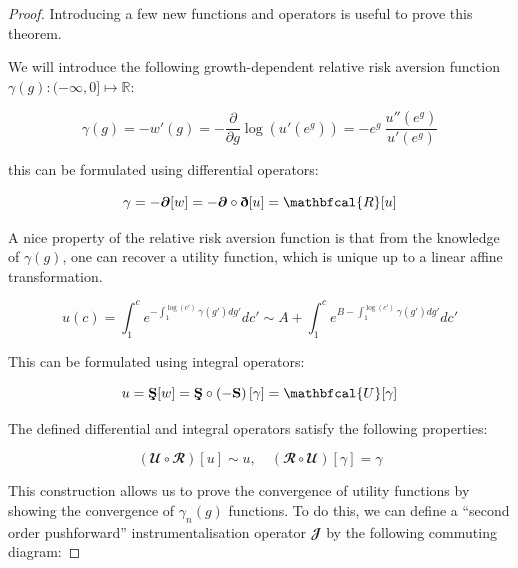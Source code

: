 \documentclass{article}
\theoremstyle{definition}
\begin{document}
\begin{proof}
    Introducing a few new functions and operators is useful to prove this theorem.

    We will introduce the following growth-dependent relative risk aversion function $\gamma(g): (-\infty, 0] \mapsto \mathbb{R}$: 

    \begin{equation}
        \gamma(g) = - w'(g) = - \frac{\partial}{\partial g} \log(u'(e^g)) =  - e^g \ \frac{ u''(e^g)}{u'(e^g)}
    \end{equation}

    this can be formulated using differential operators:

    \begin{equation}
        \gamma = - \bm{\partial} [w] = - \bm{\partial} \circ \text{\bf \dh} [u] = \mathbfcal{R} [u]
    \end{equation}

    A nice property of the relative risk aversion function is that from the knowledge of $\gamma(g)$, one can recover a utility function, which is unique up to a linear affine transformation.

    \begin{equation}
        u(c) = \int_{1}^{c} e^{-\int_{1}^{\log(c')} \gamma(g') d g'} d c' 
        \sim  A + \int_{1}^{c} e^{B - \int_{1}^{\log(c')} \gamma(g') d g'} d c' 
    \end{equation}

    This can be formulated using integral operators:

    \begin{equation}
        u = \text{\bf \c{S}} [w] = \text{\bf \c{S}} \circ \left ( - \text{\bf S} \right ) [\gamma] = \mathbfcal{U} [\gamma] 
    \end{equation}

    The defined differential and integral operators satisfy the following properties:

    \begin{equation}
        \left ( \mathbfcal{U} \circ \mathbfcal{R} \right ) [u] \sim u, \quad \left ( \mathbfcal{R} \circ \mathbfcal{U}  \right ) [\gamma] = \gamma
    \end{equation}

    This construction allows us to prove the convergence of utility functions by showing the convergence of $\gamma_n(g)$ functions.
    To do this, we can define a ``second order pushforward'' instrumentalisation operator $\mathbfcal{J}$ by the following commuting diagram:
    

\end{proof}
\end{document}
